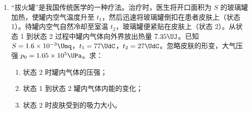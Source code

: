 \documentclass[\gkver]{gaokaozhenti}
\begin{document}
\begin{enumerate}
{（二）（1）单摆摆动过程中，在最低点绳子的拉力最大，相邻两次拉力最大的时间间隔为半个周期。从图 2 可知，从起始值到终止值经历的时间间隔 $\Delta t = 7.6530\Us - 1.1277\Us = 6.5253\Us$

则有 $\Delta t = 10 \cdot \frac{T}{2}$，解得 $T = 1.31\Us$

由题可得 $(n - 1)\frac{T}{2} = t$，解得周期为 $T = \frac{2t}{n - 1}$

（2）设小钢球重心到摆线下端的高度差为 $h$，则摆长为 $L = h + l$

根据单摆周期公式有 $T = 2\pi\sqrt{\frac{L}{g}}$

可得 $T = 2\pi\sqrt{\frac{h + l}{g}}$

变形得 $l = \frac{4\pi^{2}}{g}T^{2} - h$

可得 $l-T^{2}$ 图像的斜率为 $k = \frac{4\pi^{2}}{g}$

解得 $g = \frac{4\pi^{2}}{k}$

当 $T^{2} = b$ 时 $l = 0$，则有 $0 = \frac{4\pi^{2}}{g} \times b - h$

解得小钢球重心到摆线下端的高度差 $h = kb$

（3）小钢球有具体形状和大小，不能将其看作质点，其质心的运动轨迹半径与圆弧槽半径有偏差，导致计算时所用“摆长”不准确。
}

\item
“拔火罐”是我国传统医学的一种疗法。治疗时，医生将开口面积为 $S$ 的玻璃罐加热，使罐内空气温度升至 $t_{1}$，然后迅速将玻璃罐倒扣在患者皮肤上（状态 1）。待罐内空气自然冷却至室温 $t_{2}$，玻璃罐便紧贴在皮肤上（状态 2）。从状态 1 到状态 2 过程中罐内气体向外界放出热量 $7.35\UJ$。已知 $S = 1.6 \times 10^{-3}\Umq$，$t_{1} = 77\UdC$，$t_{2} = 27\UdC$。忽略皮肤的形变，大气压强 $p_{0} = 1.05 \times 10^{5}\UPa$。求：


\begin{enumerate}
	\item
	状态 2 时罐内气体的压强；
	\item
	状态 1 到状态 2 罐内气体内能的变化；
	\item
	状态 2 时皮肤受到的吸力大小。
\end{enumerate}

\end{enumerate}
\end{document}
